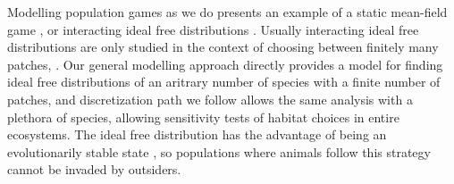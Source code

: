 



Modelling population games as we do presents an example of a static mean-field game \citep{lasry2007mean}, or interacting ideal free distributions \citep{cressman2004ideal}. Usually interacting ideal free distributions are only studied in the context of choosing between finitely many patches, \citep{kvrivan2008ideal}. Our general modelling approach directly provides a model for finding ideal free distributions of an aritrary number of species with a finite number of patches, and discretization path we follow allows the same analysis with a plethora of species, allowing sensitivity tests of habitat choices in entire ecosystems. The ideal free distribution has the advantage of being an evolutionarily stable state \citep{cressman2010ideal, kvrivan2009evolutionary}, so populations where animals follow this strategy cannot be invaded by outsiders.



